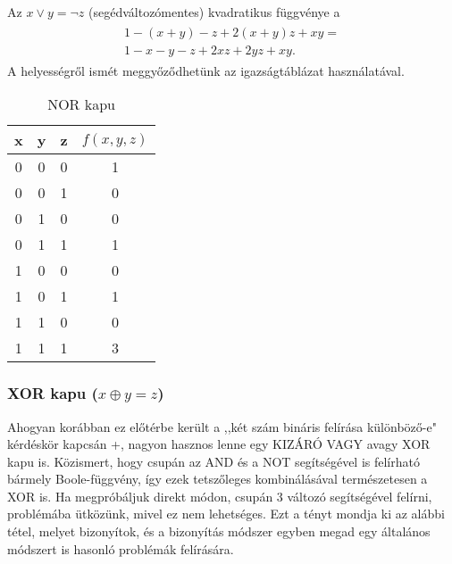 \begin{allitas}
	Az $x \vee y = \neg z$ (segédváltozómentes) kvadratikus függvénye a 
	\begin{align}
	\begin{split}
		1-(x+y)-z+2(x+y)z+xy = \\
		 1-x-y-z+2xz+2yz+xy.
	\end{split}
	\end{align}	
	A helyességről ismét meggyőződhetünk az igazságtáblázat használatával.
\end{allitas}

\begin{table}[ht]
	\footnotesize
	\centering
	\begin{tabular}{ c c c c }
		\toprule
		x & y & z & $f(x,y,z)$ \\
		\midrule
		0 & 0 & 0 & 1 \\
		0 & 0 & 1 & 0 \\
		0 & 1 & 0 & 0 \\
		0 & 1 & 1 & 1 \\
		1 & 0 & 0 & 0 \\
		1 & 0 & 1 & 1 \\
		1 & 1 & 0 & 0 \\
		1 & 1 & 1 & 3 \\		
		\bottomrule
	\end{tabular}
	\caption{NOR kapu}
	\label{tab:NORgate}
\end{table}

\subsubsection{XOR kapu ($x \oplus y = z$)} \label{sec:XORgate}

Ahogyan korábban ez előtérbe került a ,,két szám bináris felírása különböző-e" kérdéskör kapcsán \az+, nagyon hasznos lenne egy KIZÁRÓ VAGY avagy XOR kapu is. Közismert, hogy csupán az AND és a NOT segítségével is felírható bármely Boole-függvény, így ezek tetszőleges kombinálásával természetesen a XOR is.
Ha megpróbáljuk direkt módon, csupán 3 változó segítségével felírni, problémába ütközünk, mivel ez nem lehetséges. Ezt a tényt mondja ki az alábbi tétel, melyet bizonyítok, és a bizonyítás módszer egyben megad egy általános módszert is hasonló problémák felírására.

